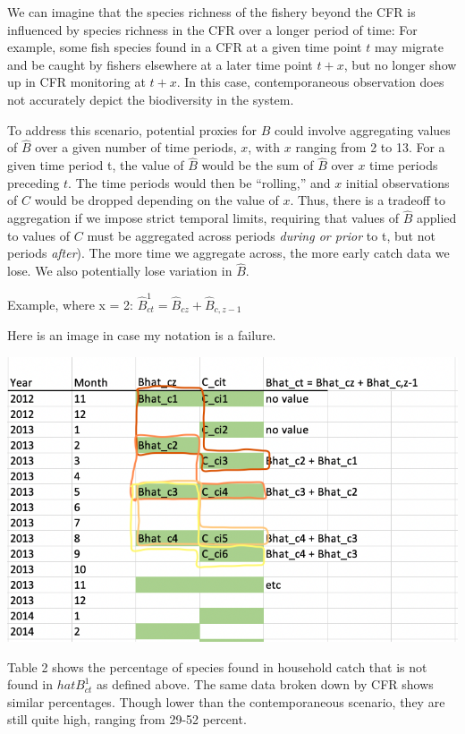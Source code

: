 \documentclass[
]{article}
\begin{document}
We can imagine that the species richness of the fishery beyond the CFR
is influenced by species richness in the CFR over a longer period of
time: For example, some fish species found in a CFR at a given time
point \(t\) may migrate and be caught by fishers elsewhere at a later
time point \(t+x\), but no longer show up in CFR monitoring at \(t+x\).
In this case, contemporaneous observation does not accurately depict the
biodiversity in the system.

To address this scenario, potential proxies for \(B\) could involve
aggregating values of \(\hat{B}\) over a given number of time periods,
\(x\), with \(x\) ranging from 2 to 13. For a given time period t, the
value of \(\hat{B}\) would be the sum of \(\hat{B}\) over \(x\) time
periods preceding \(t\). The time periods would then be ``rolling,'' and
\(x\) initial observations of \(C\) would be dropped depending on the
value of \(x\). Thus, there is a tradeoff to aggregation if we impose
strict temporal limits, requiring that values of \(\hat{B}\) applied to
values of \(C\) must be aggregated across periods \emph{during or prior}
to t, but not periods \emph{after}). The more time we aggregate across,
the more early catch data we lose. We also potentially lose variation in
\(\hat{B}\).

Example, where x = 2:
\(\hat{B}_{ct}^1 = \hat{B}_{cz} + \hat{B}_{c,z-1}\)

Here is an image in case my notation is a failure.

\includegraphics{images/data_structure2.png}

Table 2 shows the percentage of species found in household catch that is
not found in \(hat{B}_{ct}^1\) as defined above. The same data broken
down by CFR shows similar percentages. Though lower than the
contemporaneous scenario, they are still quite high, ranging from 29-52
percent.
\end{document}
